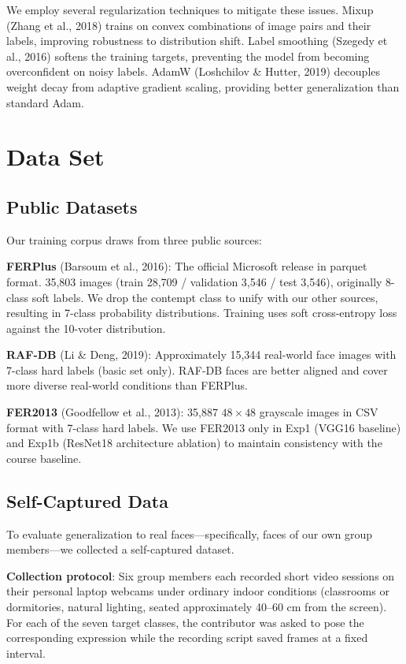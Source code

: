 \documentclass[12pt,a4paper]{article}
\begin{document}
We employ several regularization techniques to mitigate these issues. Mixup (Zhang et al., 2018) trains on convex combinations of image pairs and their labels, improving robustness to distribution shift. Label smoothing (Szegedy et al., 2016) softens the training targets, preventing the model from becoming overconfident on noisy labels. AdamW (Loshchilov \& Hutter, 2019) decouples weight decay from adaptive gradient scaling, providing better generalization than standard Adam.

\section{Data Set}

\subsection{Public Datasets}

Our training corpus draws from three public sources:

\textbf{FERPlus} (Barsoum et al., 2016): The official Microsoft release in parquet format. 35,803 images (train 28,709 / validation 3,546 / test 3,546), originally 8-class soft labels. We drop the contempt class to unify with our other sources, resulting in 7-class probability distributions. Training uses soft cross-entropy loss against the 10-voter distribution.

\textbf{RAF-DB} (Li \& Deng, 2019): Approximately 15,344 real-world face images with 7-class hard labels (basic set only). RAF-DB faces are better aligned and cover more diverse real-world conditions than FERPlus.

\textbf{FER2013} (Goodfellow et al., 2013): 35,887 $48\times48$ grayscale images in CSV format with 7-class hard labels. We use FER2013 only in Exp1 (VGG16 baseline) and Exp1b (ResNet18 architecture ablation) to maintain consistency with the course baseline.

\subsection{Self-Captured Data}

To evaluate generalization to real faces---specifically, faces of our own group members---we collected a self-captured dataset.

\textbf{Collection protocol}: Six group members each recorded short video sessions on their personal laptop webcams under ordinary indoor conditions (classrooms or dormitories, natural lighting, seated approximately 40--60 cm from the screen). For each of the seven target classes, the contributor was asked to pose the corresponding expression while the recording script saved frames at a fixed interval.
\end{document}
